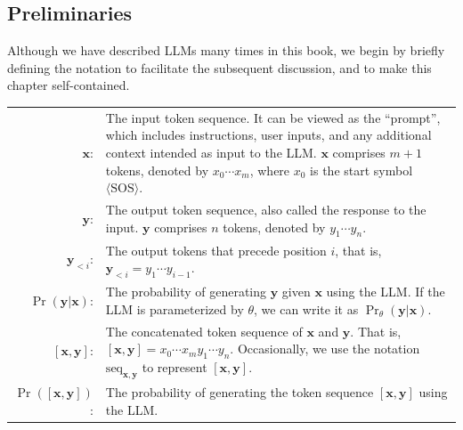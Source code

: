 \subsection{Preliminaries}

Although we have described LLMs many times in this book, we begin by briefly defining the notation to facilitate the subsequent discussion, and to make this chapter self-contained.

\vspace{0.5em}
\begingroup
\setlength{\tabcolsep}{5pt}
\begin{tabular}{r l l}
$\mathbf{x}$: & \multicolumn{2}{p{0.75\textwidth}}{
The input token sequence. It can be viewed as the ``prompt'', which includes instructions, user inputs, and any additional context intended as input to the LLM. $\mathbf{x}$ comprises $m+1$ tokens, denoted by $x_0\cdots x_m$, where $x_0$ is the start symbol $\langle \mathrm{SOS} \rangle$.
\vspace{0.5em}
} \\
$\mathbf{y}$: & \multicolumn{2}{p{0.75\textwidth}}{
The output token sequence, also called the response to the input. $\mathbf{y}$ comprises $n$ tokens, denoted by $y_1\cdots y_n$.
\vspace{0.5em}
} \\
$\mathbf{y}_{<i}$: & \multicolumn{2}{p{0.75\textwidth}}{
The output tokens that precede position $i$, that is, $\mathbf{y}_{<i} = y_1\cdots y_{i-1}$.
\vspace{0.5em}
} \\
$\Pr(\mathbf{y}|\mathbf{x})$: & \multicolumn{2}{p{0.75\textwidth}}{
The probability of generating $\mathbf{y}$ given $\mathbf{x}$ using the LLM. If the LLM is parameterized by $\theta$, we can write it as $\Pr_{\theta}(\mathbf{y}|\mathbf{x})$.
\vspace{0.5em}
} \\
$[\mathbf{x},\mathbf{y}]$: & \multicolumn{2}{p{0.75\textwidth}}{
The concatenated token sequence of $\mathbf{x}$ and $\mathbf{y}$. That is, $[\mathbf{x},\mathbf{y}] = x_0 \cdots x_m y_1 \cdots y_n$. Occasionally, we use the notation $\mathrm{seq}_{\mathbf{x},\mathbf{y}}$ to represent $[\mathbf{x},\mathbf{y}]$.
\vspace{0.5em}
} \\
$\Pr([\mathbf{x},\mathbf{y}])$: & \multicolumn{2}{p{0.75\textwidth}}{
The probability of generating the token sequence $[\mathbf{x},\mathbf{y}]$ using the LLM.
\vspace{0.5em}
}
\end{tabular}
\endgroup
\vspace{0.5em}


